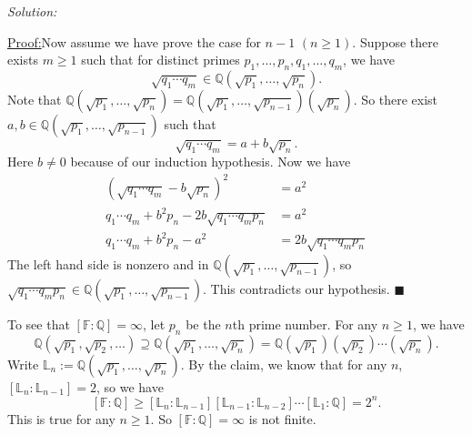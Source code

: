\documentclass[a4paper, 12pt]{article}
\newenvironment{problem}[2][Exercise]
    { \begin{mdframed}[backgroundcolor=gray!20] \textbf{#1 #2} \\}
    {  \end{mdframed}}
\newenvironment{solution}
    {\textit{Solution:}}
    {}
\newenvironment{claimproof}[1]{\par\noindent\underline{Proof:}\space#1}{\hfill $\blacksquare$}
\begin{document}
\begin{solution}
\begin{claimproof}
Now assume we have prove the case for \(n-1\) \((n\geq 1)\). Suppose there exists \(m\geq 1\) such that for distinct primes \(p_1,\ldots,p_n,q_1,\ldots,q_m\), we have 
\[\sqrt{q_1\cdots q_m}\in \mathbb{Q}(\sqrt{p_1},\ldots,\sqrt{p_n}).\]
Note that \(\mathbb{Q}(\sqrt{p_1},\ldots, \sqrt{p_n})=\mathbb{Q}(\sqrt{p_1},\ldots,\sqrt{p_{n-1}})(\sqrt{p_n})\). So there exist \(a,b\in \mathbb{Q}(\sqrt{p_1},\ldots,\sqrt{p_{n-1}})\) such that 
\[\sqrt{q_1\cdots q_m}=a+b\sqrt{p_n}.\]
Here \(b\neq 0\) because of our induction hypothesis. Now we have  
\begin{align*}
	(\sqrt{q_1\cdots q_m}-b\sqrt{p_n})^2&=a^2\\ 
	q_1\cdots q_m+b^2p_n-2b\sqrt{q_1\cdots q_mp_n}&=a^2\\ 
	q_1\cdots q_m+b^2p_n-a^2&=2b\sqrt{q_1\cdots q_mp_n}
\end{align*}
The left hand side is nonzero and in \(\mathbb{Q}(\sqrt{p_1},\ldots,\sqrt{p_{n-1}})\), so \(\sqrt{q_1\cdots q_mp_n}\in \mathbb{Q}(\sqrt{p_1},\ldots,\sqrt{p_{n-1}})\). This contradicts our hypothesis.
\end{claimproof}

To see that \([\mathbb{F}:\mathbb{Q}]=\infty\), let \(p_n\) be the \(n\)th prime number. For any \(n\geq 1\), we have 
\[\mathbb{Q}(\sqrt{p_1},\sqrt{p_2},\ldots)\supseteq \mathbb{Q}(\sqrt{p_1},\ldots,\sqrt{p_n})=\mathbb{Q}(\sqrt{p_1})(\sqrt{p_2})\cdots (\sqrt{p_n}).\]
Write \(\mathbb{L}_n:=\mathbb{Q}(\sqrt{p_1},\ldots,\sqrt{p_n})\). By the claim, we know that for any \(n\), \([\mathbb{L}_n:\mathbb{L}_{n-1}]=2\), so we have 
\[[\mathbb{F}:\mathbb{Q}]\geq [\mathbb{L}_n:\mathbb{L}_{n-1}][\mathbb{L}_{n-1}:\mathbb{L}_{n-2}]\cdots [\mathbb{L}_1:\mathbb{Q}]=2^n.\]
This is true for any \(n\geq 1\). So \([\mathbb{F}:\mathbb{Q}]=\infty\) is not finite.
\end{solution}

\begin{comment}

\begin{problem}{10.1.19}
Given a field extension \(\mathbb{K}/\Bbbk\), the set \(\mathbb{L}\) of all elements of \(\mathbb{K}\) which are algebraic over \(\Bbbk\) is a subfield of \(\mathbb{K}\) containing \(\Bbbk\).
\end{problem}


	
\end{comment}
\end{document}
